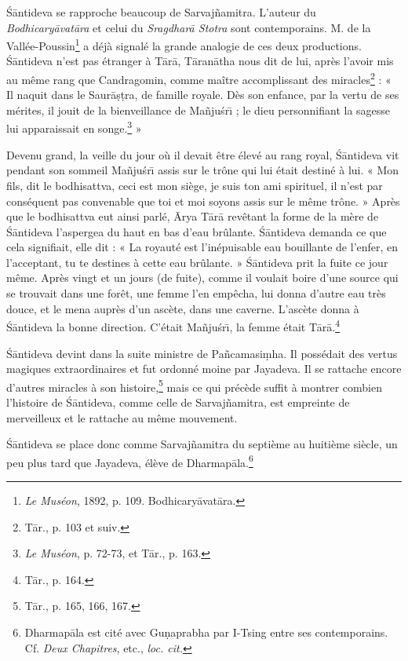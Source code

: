 \documentclass[a4paper, 11pt, oneside, french]{article}
\begin{document}
\'{S}\={a}ntideva se rapproche beaucoup de Sarvaj\~{n}amitra. L'auteur du \emph{Bodhicary\={a}vat\={a}ra} et celui du \emph{Sragdhar\={a} Stotra} sont contemporains. M. de la Vallée-Poussin\footnote{\emph{Le Muséon}, 1892, p. 109. Bodhicary\={a}vat\={a}ra.} a déjà signalé la grande analogie de ces deux productions. \'{S}\={a}ntideva n'est pas étranger à T\={a}r\={a}, T\={a}ran\={a}tha nous dit de lui, après l'avoir mis au même rang que Candragomin, comme maître accomplissant des miracles\footnote{T\={a}r., p. 103 et suiv.} : « Il naquit dans le Saur\={a}\d{s}\d{t}ra, de famille royale. Dès son enfance, par la vertu de ses mérites, il jouit de la bienveillance de Ma\~{n}ju\'{s}r\={\i} ; le dieu personnifiant la sagesse lui apparaissait en songe.\footnote{\emph{Le Muséon}, p. 72-73, et T\={a}r., p. 163.} »

Devenu grand, la veille du jour où il devait être élevé au rang royal, \'{S}\={a}ntideva vit pendant son sommeil Ma\~{n}ju\'{s}r\={\i} assis sur le trône qui lui était destiné à lui. « Mon fils, dit le bodhisattva, ceci est mon siège, je suis ton ami spirituel, il n'est par conséquent pas convenable que toi et moi soyons assis sur le même trône. » Après que le bodhisattva eut ainsi parlé, \={A}rya T\={a}r\={a} revêtant la forme de la mère de \'{S}\={a}ntideva l'aspergea du haut en bas d'eau brûlante. \'{S}\={a}ntideva demanda ce que cela signifiait, elle dit : « La royauté est l'inépuisable eau bouillante de l'enfer, en l'acceptant, tu te destines à cette eau brûlante. » \'{S}\={a}ntideva prit la fuite ce jour même. Après vingt et un jours (de fuite), comme il voulait boire d'une source qui se trouvait dans une forêt, une femme l'en empêcha, lui donna d'autre eau très douce, et le mena auprès d'un ascète, dans une caverne. L'ascète donna à \'{S}\={a}ntideva la bonne direction. C'était Ma\~{n}ju\'{s}r\={\i}, la femme était T\={a}r\={a}.\footnote{T\={a}r., p. 164.}

\'{S}\={a}ntideva devint dans la suite ministre de Pa\~{n}camasi\d{m}ha. Il possédait des vertus magiques extraordinaires et fut ordonné moine par Jayadeva. Il se rattache encore d'autres miracles à son histoire,\footnote{T\={a}r., p. 165, 166, 167.} mais ce qui précède suffit à montrer combien l'histoire de \'{S}\={a}ntideva, comme celle de Sarvaj\~{n}amitra, est empreinte de merveilleux et le rattache au même mouvement.

\'{S}\={a}ntideva se place donc comme Sarvaj\~{n}amitra du septième au huitième siècle, un peu plus tard que Jayadeva, élève de Dharmap\={a}la.\footnote{Dharmap\={a}la est cité avec Gu\d{n}aprabha par I-Tsing entre ses contemporains. Cf. \emph{Deux Chapitres}, etc., \emph{loc. cit.}}
\end{document}
